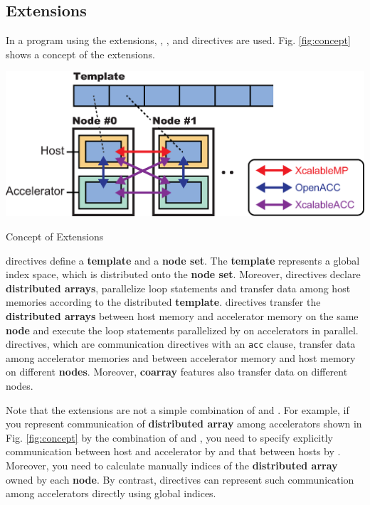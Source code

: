 \subsection{{\XMP} Extensions}
In a program using the {\XMP} extensions,
{\XMP}, {\OACC}, and {\XACC} directives are used.
Fig. \ref{fig:concept} shows a concept of the {\XMP} extensions.

\begin{myfigure}
\includegraphics[scale=0.5,clip]{figs/concept.eps}
  \caption{Concept of {\XMP} Extensions}\label{fig:concept}
\end{myfigure}

{\XMP} directives define a {\bf template} and a {\bf node set}.
The {\bf template} represents a global index space, which is distributed onto the {\bf node set}.
Moreover, {\XMP} directives declare {\bf distributed arrays},
parallelize loop statements and transfer data among host memories according to the distributed {\bf template}.
{\OACC} directives transfer the {\bf distributed arrays} between host memory and accelerator memory on the same {\bf node}
and execute the loop statements parallelized by {\XMP} on accelerators in parallel.
{\XACC} directives, which are {\XMP} communication directives with an {\tt acc} clause, 
transfer data among accelerator memories and between accelerator memory and host memory on different {\bf nodes}.
Moreover, 
{\bf coarray} features also transfer data on different nodes.

Note that 
the {\XMP} extensions are not a simple combination of {\XMP} and {\OACC}.
For example, 
if you represent communication of {\bf distributed array} among accelerators shown in Fig. \ref{fig:concept} by the combination of {\XMP} and {\OACC},
you need to specify explicitly communication between host and accelerator by {\OACC} and that between hosts by {\XMP}.
Moreover,
you need to calculate manually indices of the {\bf distributed array} owned by each {\bf node}.
By contrast,
{\XACC} directives can represent such communication among accelerators directly using global indices.

